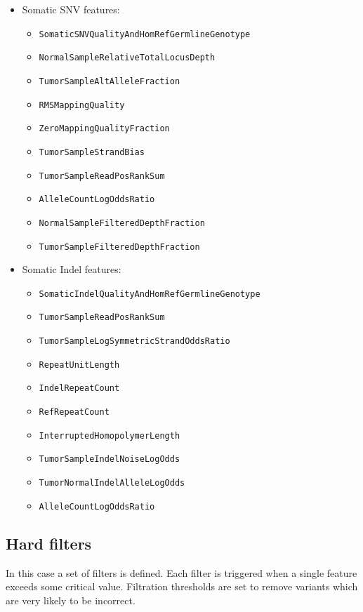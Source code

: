\documentclass{article}
\begin{document}
\begin{itemize}
    \item Somatic SNV features:
    \begin{itemize}
        \item \texttt{SomaticSNVQualityAndHomRefGermlineGenotype}
        \item \texttt{NormalSampleRelativeTotalLocusDepth}
        \item \texttt{TumorSampleAltAlleleFraction}
        \item \texttt{RMSMappingQuality}
        \item \texttt{ZeroMappingQualityFraction}
        \item \texttt{TumorSampleStrandBias}
        \item \texttt{TumorSampleReadPosRankSum}
        \item \texttt{AlleleCountLogOddsRatio}
        \item \texttt{NormalSampleFilteredDepthFraction}
        \item \texttt{TumorSampleFilteredDepthFraction}
    \end{itemize}
    \item Somatic Indel features:
    \begin{itemize}
        \item \texttt{SomaticIndelQualityAndHomRefGermlineGenotype}
        \item \texttt{TumorSampleReadPosRankSum}
        \item \texttt{TumorSampleLogSymmetricStrandOddsRatio}
        \item \texttt{RepeatUnitLength}
        \item \texttt{IndelRepeatCount}
        \item \texttt{RefRepeatCount}
        \item \texttt{InterruptedHomopolymerLength}
        \item \texttt{TumorSampleIndelNoiseLogOdds}
        \item \texttt{TumorNormalIndelAlleleLogOdds}
        \item \texttt{AlleleCountLogOddsRatio}
    \end{itemize}
\end{itemize}

\subsection{Hard filters}

In this case a set of filters is defined. Each filter is triggered when a single feature exceeds some critical value. Filtration thresholds are set to remove variants which are very likely to be incorrect.
\end{document}
